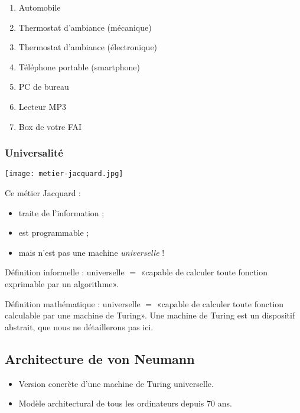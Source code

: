 \begin{multicols}{2}
\begin{enumerate}
\item Automobile
\item Thermostat d'ambiance (mécanique)
\item Thermostat d'ambiance (électronique)
\item Téléphone portable (smartphone)
\item PC de bureau
\item Lecteur MP3
\item Box de votre FAI
\end{enumerate}

\subsubsection*{Universalité}
\begin{center}
\texttt{[image: metier-jacquard.jpg]}
\end{center}
  Ce métier Jacquard :
  \begin{itemize}
  \item traite de l'information ;
  \item est programmable ;
  \item mais n'est pas une machine \emph{universelle} !
  \end{itemize}

\begin{defi}
Définition informelle : universelle $=$ «capable de calculer toute fonction exprimable par un
algorithme».

Définition mathématique : universelle $=$ «capable de calculer toute fonction calculable par
  une machine de Turing».
Une machine de Turing est un dispositif abstrait, que nous ne détaillerons pas ici. 
\end{defi}

\subsection*{Architecture de von Neumann}

\begin{itemize}
\item Version concrète d'une machine de Turing universelle.
\item Modèle architectural de tous les ordinateurs depuis 70 ans.
\end{itemize}


\end{multicols}
